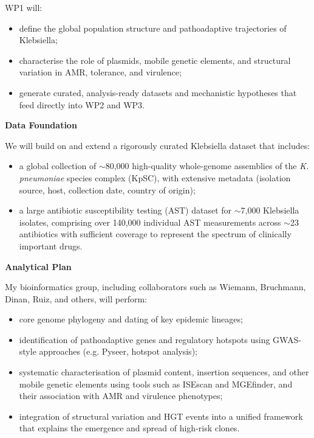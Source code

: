 WP1 will:

\begin{itemize}
  \item define the global population structure and pathoadaptive trajectories of Klebsiella;
  \item characterise the role of plasmids, mobile genetic elements, and structural variation in AMR, tolerance, and virulence;
  \item generate curated, analysis-ready datasets and mechanistic hypotheses that feed directly into WP2 and WP3.
\end{itemize}

\textbf{Data Foundation}

We will build on and extend a rigorously curated Klebsiella dataset that includes:

\begin{itemize}
  \item a global collection of $\sim$80{,}000 high-quality whole-genome assemblies of the \textit{K. pneumoniae} species complex (KpSC), with extensive metadata (isolation source, host, collection date, country of origin);
  \item a large antibiotic susceptibility testing (AST) dataset for $\sim$7{,}000 Klebsiella isolates, comprising over 140{,}000 individual AST measurements across $\sim$23 antibiotics with sufficient coverage to represent the spectrum of clinically important drugs.
\end{itemize}

\textbf{Analytical Plan}

My bioinformatics group, including collaborators such as Wiemann, Bruchmann, Dinan, Ruiz, and others, will perform:

\begin{itemize}
  \item core genome phylogeny and dating of key epidemic lineages;
  \item identification of pathoadaptive genes and regulatory hotspots using GWAS-style approaches (e.g. Pyseer, hotspot analysis);
  \item systematic characterisation of plasmid content, insertion sequences, and other mobile 
  genetic elements using tools such as ISEscan and MGEfinder, and their association with AMR and virulence phenotypes;
  \item integration of structural variation and HGT events into a unified framework that explains the 
  emergence and spread of high-risk clones.
\end{itemize}

